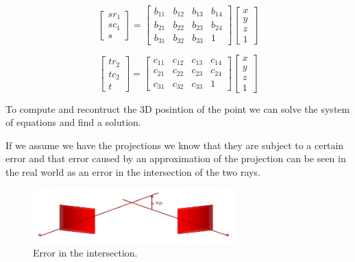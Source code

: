 \begin{multicols}{2}

    \[
        \begin{bmatrix}
            sr_1 \\
            sc_1 \\
            s
        \end{bmatrix}  
        =
        \begin{bmatrix}
            b_{11} & b_{12} & b_{13} & b_{14} \\
            b_{21} & b_{22} & b_{23} & b_{24} \\
            b_{31} & b_{32} & b_{33} & 1
        \end{bmatrix}
        \begin{bmatrix}
            x \\
            y \\
            z \\
            1
        \end{bmatrix}
    \]

    \[
        \begin{bmatrix}
            tr_2 \\
            tc_2 \\
            t
        \end{bmatrix}  
        =
        \begin{bmatrix}
            c_{11} & c_{12} & c_{13} & c_{14} \\
            c_{21} & c_{22} & c_{23} & c_{24} \\
            c_{31} & c_{32} & c_{33} & 1
        \end{bmatrix}
        \begin{bmatrix}
            x \\
            y \\
            z \\
            1
        \end{bmatrix}
    \]
\end{multicols}

To compute and recontruct the 3D posintion of the point we can solve the system of equations and find a solution.

If we assume we have the projections we know that they are subject to a certain error and that error caused by an approximation of the projection can be seen in the real world as an error in the intersection of the two rays.


\begin{figure}[H]
    \centering
    \includegraphics[width=0.7\textwidth]{Figures/inter.png}
    \caption{Error in the intersection.}
    \label{fig:inter}
\end{figure}

